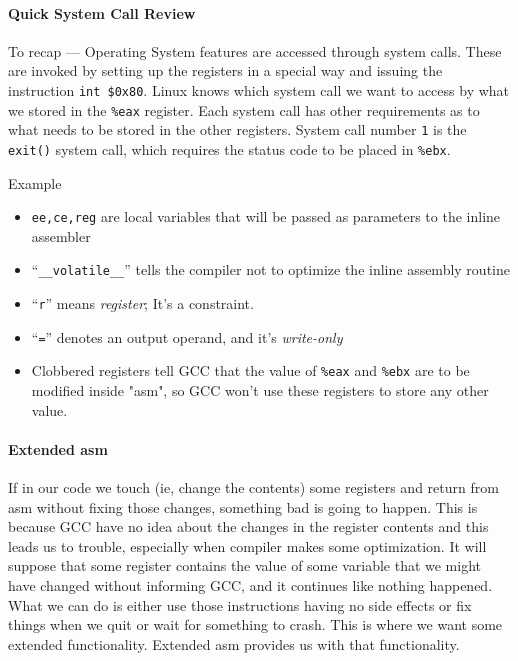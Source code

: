 \paragraph{Quick System Call Review}

To recap --- Operating System features are accessed through system calls. These are
invoked by setting up the registers in a special way and issuing the instruction
\texttt{int \$0x80}.  Linux knows which system call we want to access by what we stored in
the \texttt{\%eax} register. Each system call has other requirements as to what needs to
be stored in the other registers. System call number \texttt{1} is the \texttt{exit()}
system call, which requires the status code to be placed in
\texttt{\%ebx}. 

\begin{frame}
  \begin{block}{Example}
    \begin{center}
    \end{center}
  \end{block}
  \begin{itemize}
  \item \texttt{ee,ce,reg} are local variables that will be passed as parameters to the
    inline assembler
  \item ``\texttt{\_\_volatile\_\_}'' tells the compiler not to optimize the inline
    assembly routine
  \item ``\texttt{r}'' means \emph{register}; It's a constraint.
  \item ``\texttt{=}'' denotes an output operand, and it's \emph{write-only}
  \item Clobbered registers tell GCC that the value of \texttt{\%eax} and \texttt{\%ebx}
    are to be modified inside "asm", so GCC won't use these registers to store any other
    value.
  \end{itemize}
\end{frame}

\paragraph{Extended asm}

If in our code we touch (ie, change the contents) some registers and return from asm
without fixing those changes, something bad is going to happen. This is because GCC have
no idea about the changes in the register contents and this leads us to trouble,
especially when compiler makes some optimization. It will suppose that some register
contains the value of some variable that we might have changed without informing GCC, and
it continues like nothing happened. What we can do is either use those instructions having
no side effects or fix things when we quit or wait for something to crash. This is where
we want some extended functionality. Extended asm provides us with that
functionality. 

